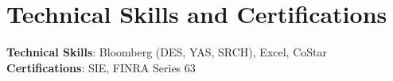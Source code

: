 \documentclass[letterpaper,11pt]{article}
\begin{document}
\section{Technical Skills and Certifications}
    \begin{itemize}[leftmargin=0.15in, label={}]
        \small{\item{
            \textbf{Technical Skills}{: Bloomberg (DES, YAS, SRCH), Excel, CoStar} \\
            \textbf{Certifications}{: SIE, FINRA Series 63} \\
        }}
    \end{itemize}
 
\end{document}
